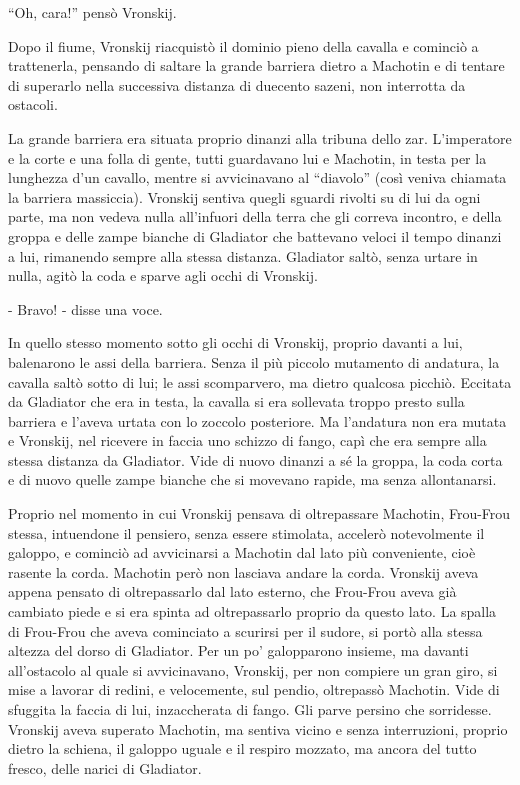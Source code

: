 ``Oh, cara!'' pensò Vronskij. 

Dopo il fiume, Vronskij riacquistò il dominio pieno della cavalla e cominciò a trattenerla, pensando di saltare la grande barriera dietro a Machotin e di tentare di superarlo nella successiva distanza di duecento sazeni, non interrotta da ostacoli. 

La grande barriera era situata proprio dinanzi alla tribuna dello zar. L'imperatore e la corte e una folla di gente, tutti guardavano lui e Machotin, in testa per la lunghezza d'un cavallo, mentre si avvicinavano al ``diavolo'' (così veniva chiamata la barriera massiccia). Vronskij sentiva quegli sguardi rivolti su di lui da ogni parte, ma non vedeva nulla all'infuori della terra che gli correva incontro, e della groppa e delle zampe bianche di Gladiator che battevano veloci il tempo dinanzi a lui, rimanendo sempre alla stessa distanza. Gladiator saltò, senza urtare in nulla, agitò la coda e sparve agli occhi di Vronskij. 

- Bravo! - disse una voce. 

In quello stesso momento sotto gli occhi di Vronskij, proprio davanti a lui, balenarono le assi della barriera. Senza il più piccolo mutamento di andatura, la cavalla saltò sotto di lui; le assi scomparvero, ma dietro qualcosa picchiò. Eccitata da Gladiator che era in testa, la cavalla si era sollevata troppo presto sulla barriera e l'aveva urtata con lo zoccolo posteriore. Ma l'andatura non era mutata e Vronskij, nel ricevere in faccia uno schizzo di fango, capì che era sempre alla stessa distanza da Gladiator. Vide di nuovo dinanzi a sé la groppa, la coda corta e di nuovo quelle zampe bianche che si movevano rapide, ma senza allontanarsi. 

Proprio nel momento in cui Vronskij pensava di oltrepassare Machotin, Frou-Frou stessa, intuendone il pensiero, senza essere stimolata, accelerò notevolmente il galoppo, e cominciò ad avvicinarsi a Machotin dal lato più conveniente, cioè rasente la corda. Machotin però non lasciava andare la corda. Vronskij aveva appena pensato di oltrepassarlo dal lato esterno, che Frou-Frou aveva già cambiato piede e si era spinta ad oltrepassarlo proprio da questo lato. La spalla di Frou-Frou che aveva cominciato a scurirsi per il sudore, si portò alla stessa altezza del dorso di Gladiator. Per un po' galopparono insieme, ma davanti all'ostacolo al quale si avvicinavano, Vronskij, per non compiere un gran giro, si mise a lavorar di redini, e velocemente, sul pendio, oltrepassò Machotin. Vide di sfuggita la faccia di lui, inzaccherata di fango. Gli parve persino che sorridesse. Vronskij aveva superato Machotin, ma sentiva vicino e senza interruzioni, proprio dietro la schiena, il galoppo uguale e il respiro mozzato, ma ancora del tutto fresco, delle narici di Gladiator. 

